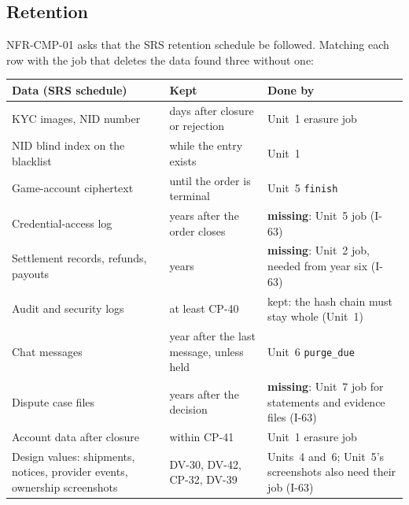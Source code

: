 \documentclass[11pt,a4paper]{article}
\newenvironment{dtable}[1]{\small\begin{longtable}{#1}}{\end{longtable}}
\begin{document}
\subsection{Retention}
\label{sec:retention}
NFR-CMP-01 asks that the SRS retention schedule be followed. Matching each row with the job that deletes the data found three without one:
\begin{dtable}{@{}>{\raggedright\arraybackslash}p{4.4cm}>{\raggedright\arraybackslash}p{4.4cm}>{\raggedright\arraybackslash}p{6.4cm}@{}}
\toprule
\textbf{Data (SRS schedule)} & \textbf{Kept} & \textbf{Done by} \\ \midrule \endhead
KYC images, NID number & 30 days after closure or rejection & Unit~1 erasure job \\
NID blind index on the blacklist & while the entry exists & Unit~1 \\
Game-account ciphertext & until the order is terminal & Unit~5 \texttt{finish} \\
Credential-access log & 2 years after the order closes & \textbf{missing}: Unit~5 job (I-63) \\
Settlement records, refunds, payouts & 6 years & \textbf{missing}: Unit~2 job, needed from year six (I-63) \\
Audit and security logs & at least CP-40 & kept: the hash chain must stay whole (Unit~1) \\
Chat messages & 1 year after the last message, unless held & Unit~6 \texttt{purge\_due} \\
Dispute case files & 2 years after the decision & \textbf{missing}: Unit~7 job for statements and evidence files (I-63) \\
Account data after closure & within CP-41 & Unit~1 erasure job \\
Design values: shipments, notices, provider events, ownership screenshots & DV-30, DV-42, CP-32, DV-39 & Units~4 and~6; Unit~5's screenshots also need their job (I-63) \\
\bottomrule
\end{dtable}
\end{document}
